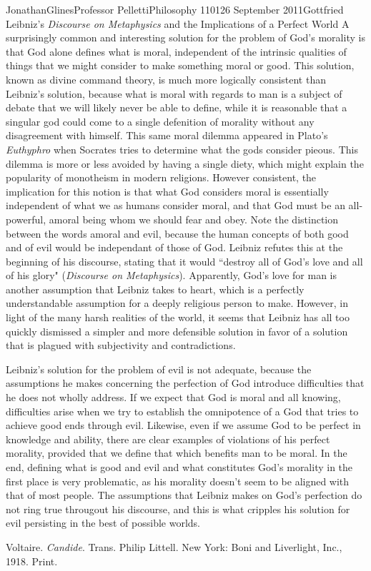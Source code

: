 \documentclass[12pt,letterpaper]{article}
\begin{document}
\begin{mla}{Jonathan}{Glines}{Professor Pelletti}{Philosophy 1101}{26 September 2011}{Gottfried Leibniz's \textit{Discourse on Metaphysics} and the Implications of a Perfect World}
A surprisingly common and interesting solution for the problem of God's morality is that God alone defines what is moral, independent of the intrinsic qualities of things that we might consider to make something moral or good. This solution, known as divine command theory, is much more logically consistent than Leibniz's solution, because what is moral with regards to man is a subject of debate that we will likely never be able to define, while it is reasonable that a singular god could come to a single defenition of morality without any disagreement with himself. This same moral dilemma appeared in Plato's \textit{Euthyphro} when Socrates tries to determine what the gods consider pieous. This dilemma is more or less avoided by having a single diety, which might explain the popularity of monotheism in modern religions. However consistent, the implication for this notion is that what God considers moral is essentially independent of what we as humans consider moral, and that God must be an all-powerful, amoral being whom we should fear and obey. Note the distinction between the words amoral and evil, because the human concepts of both good and of evil would be independant of those of God. Leibniz refutes this at the beginning of his discourse, stating that it would ``destroy all of God's love and all of his glory" (\textit{Discourse on Metaphysics}). Apparently, God's love for man is another assumption that Leibniz takes to heart, which is a perfectly understandable assumption for a deeply religious person to make. However, in light of the many harsh realities of the world, it seems that Leibniz has all too quickly dismissed a simpler and more defensible solution in favor of a solution that is plagued with subjectivity and contradictions.

Leibniz's solution for the problem of evil is not adequate, because the assumptions he makes concerning the perfection of God introduce difficulties that he does not wholly address. If we expect that God is moral and all knowing, difficulties arise when we try to establish the omnipotence of a God that tries to achieve good ends through evil. Likewise, even if we assume God to be perfect in knowledge and ability, there are clear examples of violations of his perfect morality, provided that we define that which benefits man to be moral. In the end, defining what is good and evil and what constitutes God's morality in the first place is very problematic, as his morality doesn't seem to be aligned with that of most people. The assumptions that Leibniz makes on God's perfection do not ring true througout his discourse, and this is what cripples his solution for evil persisting in the best of possible worlds.


\begin{workscited}

\bibent
Voltaire.  \textit{Candide}.  Trans. Philip Littell.  New York: Boni and Liverlight, Inc., 1918.  Print.

\end{workscited}
\end{mla}
\end{document}
